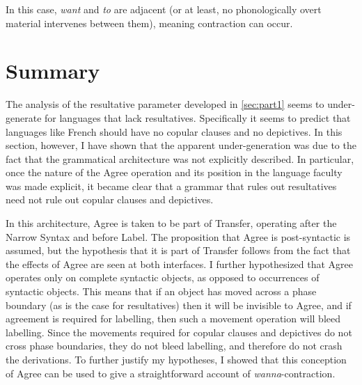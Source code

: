 \documentclass[MilwayThesis]{subfiles}
\begin{document}
In this case, \textit{want} and \textit{to} are adjacent (or at least, no phonologically overt material intervenes between them), meaning contraction can occur.

\section{Summary}
The analysis of the resultative parameter developed in \cref{sec:part1} seems to under-generate for languages that lack resultatives.
Specifically it seems to predict that languages like French should have no copular clauses and no depictives.
In this section, however, I have shown that the apparent under-generation was due to the fact that the grammatical architecture was not explicitly described.
In particular, once the nature of the Agree operation and its position in the language faculty was made explicit, it became clear that a grammar that rules out resultatives need not rule out copular clauses and depictives.

In this architecture, Agree is taken to be part of Transfer, operating after the Narrow Syntax and before Label.
The proposition that Agree is post-syntactic is assumed, but the hypothesis that it is part of Transfer follows from the fact that the effects of Agree are seen at both interfaces.
I further hypothesized that Agree operates only on complete syntactic objects, as opposed to occurrences of syntactic objects.
This means that if an object has moved across a phase boundary (as is the case for resultatives) then it will be invisible to Agree, and if agreement is required for labelling, then such a movement operation will bleed labelling.
Since the movements required for copular clauses and depictives do not cross phase boundaries, they do not bleed labelling, and therefore do not crash the derivations.
To further justify my hypotheses, I showed that this conception of Agree can be used to give a straightforward account of \textit{wanna}-contraction.
\end{document}
